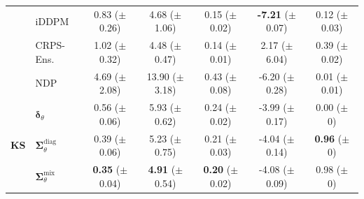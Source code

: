 \begin{tabular}{|l|l|ccccc|}
        & iDDPM & \makecell{0.83 \\ ($\pm$ 0.26)} & \makecell{4.68 \\ ($\pm$ 1.06)} & \makecell{0.15 \\ ($\pm$ 0.02)} & \makecell{\textbf{-7.21} \\ ($\pm$ 0.07)} & \makecell{0.12 \\ ($\pm$ 0.03)} \\
        & CRPS-Ens. & \makecell{1.02 \\ ($\pm$ 0.32)} & \makecell{4.48 \\ ($\pm$ 0.47)} & \makecell{0.14 \\ ($\pm$ 0.01)} & \makecell{2.17 \\ ($\pm$ 6.04)} & \makecell{0.39 \\ ($\pm$ 0.02)} \\
        & NDP & \makecell{4.69 \\ ($\pm$ 2.08)} & \makecell{13.90 \\ ($\pm$ 3.18)} & \makecell{0.43 \\ ($\pm$ 0.08)} & \makecell{-6.20 \\ ($\pm$ 0.28)} & \makecell{0.01 \\ ($\pm$ 0.01)} \\
        \midrule
        \multirow{8}{*}{\textbf{KS}}
        & $\bm\delta_\theta$ & \makecell{0.56 \\ ($\pm$ 0.06)} & \makecell{5.93 \\ ($\pm$ 0.62)} & \makecell{0.24 \\ ($\pm$ 0.02)} & \makecell{-3.99 \\ ($\pm$ 0.17)} & \makecell{0.00 \\ ($\pm$ 0)} \\
        & $\bm\Sigma_\theta^{\mathrm{diag}}$ & \makecell{0.39 \\ ($\pm$ 0.06)} & \makecell{5.23 \\ ($\pm$ 0.75)} & \makecell{0.21 \\ ($\pm$ 0.03)} & \makecell{-4.04 \\ ($\pm$ 0.14)} & \makecell{\textbf{0.96} \\ ($\pm$ 0)} \\
        & $\bm\Sigma_\theta^{\mathrm{mix}}$ & \makecell{\textbf{0.35} \\ ($\pm$ 0.04)} & \makecell{\textbf{4.91} \\ ($\pm$ 0.54)} & \makecell{\textbf{0.20} \\ ($\pm$ 0.02)} & \makecell{-4.08 \\ ($\pm$ 0.09)} & \makecell{0.98 \\ ($\pm$ 0)} \\

\end{tabular}
